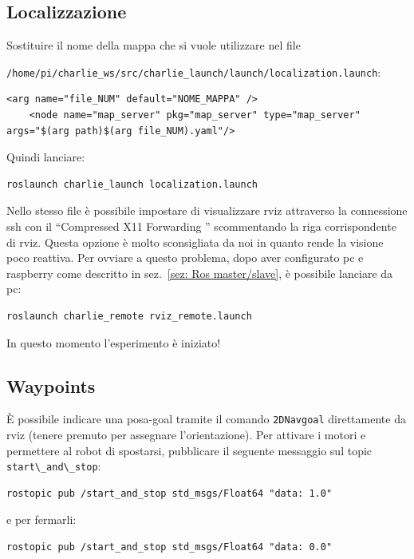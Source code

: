 \subsection*{Localizzazione}
Sostituire il nome della mappa che si vuole utilizzare nel file

\verb|/home/pi/charlie_ws/src/charlie_launch/launch/localization.launch|:

\begin{lstlisting}[style=xml, firstnumber=14]
	<arg name="file_NUM" default="NOME_MAPPA" />
	<node name="map_server" pkg="map_server" type="map_server" args="$(arg path)$(arg file_NUM).yaml"/>
\end{lstlisting}

Quindi lanciare:
\begin{lstlisting}[style=bash]
	roslaunch charlie_launch localization.launch
\end{lstlisting}

Nello stesso file \`e possibile impostare di visualizzare rviz attraverso la connessione ssh con il ``Compressed X11 Forwarding '' scommentando la riga corrispondente di rviz. Questa opzione \`e molto sconsigliata da noi in quanto rende la visione poco reattiva. Per ovviare a questo problema, dopo aver configurato pc e raspberry come descritto in sez.~\ref{sez: Ros master/slave}, \`e possibile lanciare da pc:

\begin{lstlisting}[style=bashPC]
	roslaunch charlie_remote rviz_remote.launch
\end{lstlisting}
In questo momento l'esperimento \`e iniziato!

\subsection*{Waypoints}
\`E possibile indicare una posa-goal tramite il comando \texttt{2DNavgoal} direttamente da rviz (tenere premuto per assegnare l'orientazione).
Per attivare i motori e permettere al robot di spostarsi, pubblicare il seguente messaggio sul topic \verb|start\_and\_stop|:

\begin{lstlisting}[style=bash]
	rostopic pub /start_and_stop std_msgs/Float64 "data: 1.0"
\end{lstlisting}

e per fermarli:

\begin{lstlisting}[style=bash]
	rostopic pub /start_and_stop std_msgs/Float64 "data: 0.0"
\end{lstlisting}

